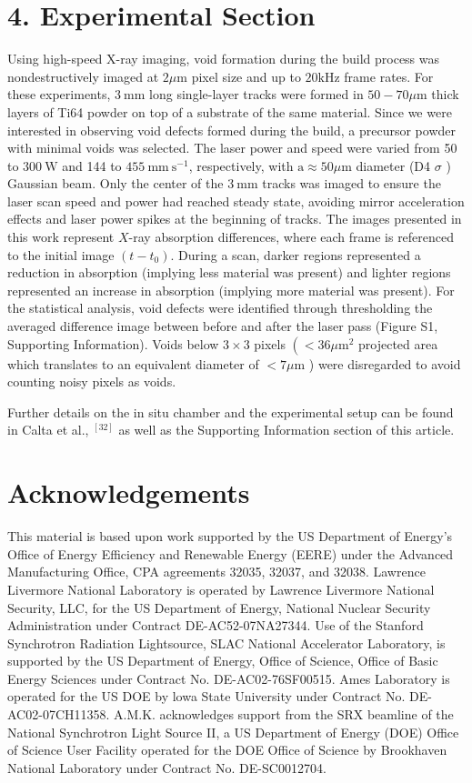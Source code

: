 \documentclass[10pt]{article}
\begin{document}
\section*{4. Experimental Section}
Using high-speed X-ray imaging, void formation during the build process was nondestructively imaged at $2 \mu \mathrm{m}$ pixel size and up to $20 \mathrm{kHz}$ frame rates. For these experiments, $3 \mathrm{~mm}$ long single-layer tracks were formed in $50-70 \mu \mathrm{m}$ thick layers of Ti64 powder on top of a substrate of the same material. Since we were interested in observing void defects formed during the build, a precursor powder with minimal voids was selected. The laser power and speed were varied from 50 to $300 \mathrm{~W}$ and 144 to $455 \mathrm{~mm} \mathrm{~s}^{-1}$, respectively, with $\mathrm{a} \approx 50 \mu \mathrm{m}$ diameter (D4 $\sigma$ ) Gaussian beam. Only the center of the $3 \mathrm{~mm}$ tracks was imaged to ensure the laser scan speed and power had reached steady state, avoiding mirror acceleration effects and laser power spikes at the beginning of tracks. The images presented in this work represent $X$-ray absorption differences, where each frame is referenced to the initial image $\left(t-t_{0}\right)$. During a scan, darker regions represented a reduction in absorption (implying less material was present) and lighter regions represented an increase in absorption (implying more material was present). For the statistical analysis, void defects were identified through thresholding the averaged difference image between before and after the laser pass (Figure S1, Supporting Information). Voids below $3 \times 3$ pixels $\left(<36 \mu \mathrm{m}^{2}\right.$ projected area which translates to an equivalent diameter of $<7 \mu \mathrm{m}$ ) were disregarded to avoid counting noisy pixels as voids.

Further details on the in situ chamber and the experimental setup can be found in Calta et al., ${ }^{[32]}$ as well as the Supporting Information section of this article.

\section*{Acknowledgements}
This material is based upon work supported by the US Department of Energy's Office of Energy Efficiency and Renewable Energy (EERE) under the Advanced Manufacturing Office, CPA agreements 32035, 32037, and 32038. Lawrence Livermore National Laboratory is operated by Lawrence Livermore National Security, LLC, for the US Department of Energy, National Nuclear Security Administration under Contract DE-AC52-07NA27344. Use of the Stanford Synchrotron Radiation Lightsource, SLAC National Accelerator Laboratory, is supported by the US Department of Energy, Office of Science, Office of Basic Energy Sciences under Contract No. DE-AC02-76SF00515. Ames Laboratory is operated for the US DOE by lowa State University under Contract No. DE-AC02-07CH11358. A.M.K. acknowledges support from the SRX beamline of the National Synchrotron Light Source II, a US Department of Energy (DOE) Office of Science User Facility operated for the DOE Office of Science by Brookhaven National Laboratory under Contract No. DE-SC0012704.
\end{document}
